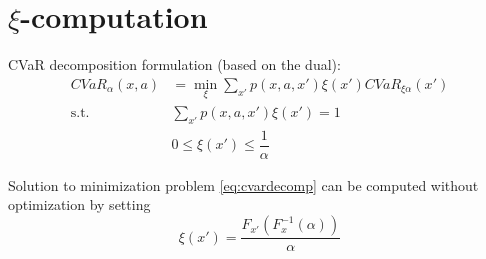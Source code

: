 


\section{$\xi$-computation}


CVaR decomposition formulation (based on the dual):
\begin{equation}\label{eq:cvardecomp}
\begin{split}
CVaR_\alpha(x, a)&=\min_{\xi} \sum_{x'} p(x, a, x')\xi(x') CVaR_{\xi\alpha}(x')\\
\text{s.t.}\quad &\sum_{x'}p(x, a, x')\xi(x')=1\\
&0 \le \xi(x')\le \dfrac{1}{\alpha}
\end{split}
\end{equation}

\begin{theorem}
Solution to minimization problem \ref{eq:cvardecomp} can be computed without optimization by setting
\begin{equation}\label{eq:xi-claim}
\xi ( x' ) = \dfrac{F_{x'}(F^{-1}_x(\alpha))}{\alpha} 
\end{equation}
\end{theorem}

